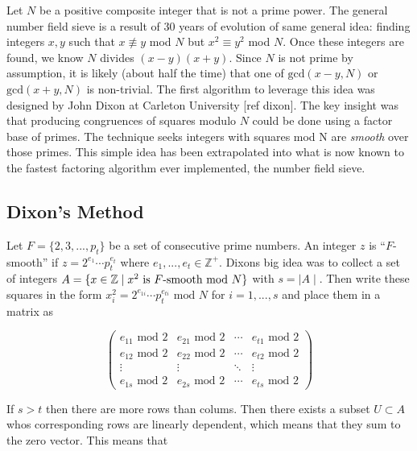 

Let $N$ be a positive composite integer that is not a prime power. The general number field sieve is a result of 30 years of evolution of same general idea: finding integers $x,y$ such that $x \not\equiv y$ mod $N$ but $x^2 \equiv y^ 2$ mod $N$. Once these integers are found, we know $N$ divides $(x - y)(x+y)$. Since $N$ is not prime by assumption, it is likely (about half the time) that one of $\text{gcd}(x-y,N)$ or  $\text{gcd}(x+y,N)$ is non-trivial. The first algorithm to leverage this idea was designed by John Dixon at Carleton University [ref dixon]. The key insight was that producing congruences of squares modulo $N$ could be done using a factor base of primes. The technique seeks integers with squares mod N are \textit{smooth} over those primes. This simple idea has been extrapolated into what is now known to the fastest factoring algorithm ever implemented, the number field sieve. 


\subsection{Dixon's Method}
  Let $F = \lbrace 2,3,...,p_t \rbrace$ be a set of consecutive prime numbers. An integer $z$ is “$F$-smooth” if $z = 2^{e_1} \cdots p_t^{e_t} $ where $e_1,...,e_t \in \mathbb{Z}^+$. Dixons big idea was to collect a set of integers $A = \lbrace x \in \mathbb{Z} \mid x^2 \text{ is }F\text{-smooth mod } N \rbrace $ with $s = \mid A \mid $. Then write these squares in the form $x_i^2 = 2^{e_{1i}}  \cdots p_{t}^{e_{ti}} \text{ mod } N$ for $i = 1,...,s$ and place them in a matrix as 

  $$
  \begin{pmatrix}
    e_{11} \text{ mod } 2 & e_{21} \text{ mod } 2 & \cdots & e_{t1} \text{ mod } 2 \\
    e_{12} \text{ mod } 2 & e_{22} \text{ mod } 2 & \cdots & e_{t2} \text{ mod } 2 \\
    \vdots  & \vdots  & \ddots & \vdots  \\
    e_{1s} \text{ mod } 2 & e_{2s} \text{ mod } 2 & \cdots & e_{ts} \text{ mod } 2 
   \end{pmatrix}
  $$

  If $s>t$ then there are more rows than colums. Then there exists a subset $U \subset A$ whos corresponding rows are linearly dependent, which means that they sum to the zero vector. This means that 


